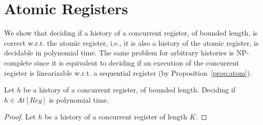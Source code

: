 
\section{Atomic Registers}

We show that deciding if a history of a concurrent register, of bounded length,
is correct w.r.t. the atomic register, i.e., it is also a history of the atomic
register, is decidable in polynomial time. The same problem for arbitrary
histories is NP-complete since it is equivalent to deciding if an execution of
the concurrent register is linearizable w.r.t. a sequential register (by
Proposition~\ref{prop:atom}).

\begin{theorem}

  Let $h$ be a history of a concurrent register, of bounded length. Deciding if
  $h\in At[Reg]$ is polynomial time.

\end{theorem}

\begin{proof}

  Let $h$ be a history of a concurrent register of length $K$.

\end{proof}